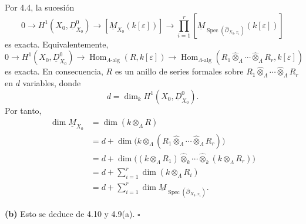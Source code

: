 Por 4.4, la sucesión
\[
0\longrightarrow H^1(X_0,\underline D^0_{X_0})
\longrightarrow[\underline M_{X_0}(k[\varepsilon])]
\longrightarrow
\prod_{i=1}^r
[\underline M_{\operatorname{Spec}(\widehat{\mathcal O}_{X_0,x_i})}
  (k[\varepsilon])]
\]
es exacta. Equivalentemente,
\[
0\longrightarrow H^1(X_0,\underline D^0_{X_0})
\longrightarrow\operatorname{Hom}_{\Lambda\text{-alg}}(R,k[\varepsilon])
\longrightarrow
\operatorname{Hom}_{\Lambda\text{-alg}}
 (R_1\widehat\otimes_\Lambda\cdots\widehat\otimes_\Lambda R_r,
  k[\varepsilon])
\]
es exacta. En consecuencia, $R$ es un anillo de series formales sobre
$R_1\widehat\otimes_\Lambda\cdots\widehat\otimes_\Lambda R_r$ en
$d$ variables, donde
\[
d=\dim_k H^1(X_0,\underline D^0_{X_0}).
\]
Por tanto,
\begin{align*}
\dim\underline M_{X_0}
 &=\dim(k\otimes_\Lambda R) \\
 &=d+\dim\bigl(k\otimes_\Lambda
   (R_1\widehat\otimes_\Lambda\cdots\widehat\otimes_\Lambda R_r)
   \bigr) \\
 &=d+\dim\bigl((k\otimes_\Lambda R_1)
   \widehat\otimes_k\cdots\widehat\otimes_k
   (k\otimes_\Lambda R_r)\bigr) \\
 &=d+\sum_{i=1}^r\dim(k\otimes_\Lambda R_i) \\
 &=d+\sum_{i=1}^r
   \dim\underline M_{\operatorname{Spec}
   (\widehat{\mathcal O}_{X_0,x_i})}.
\end{align*}


\noindent\textbf{(b)} Esto se deduce de 4.10 y 4.9(a).
\hfill$\square$
